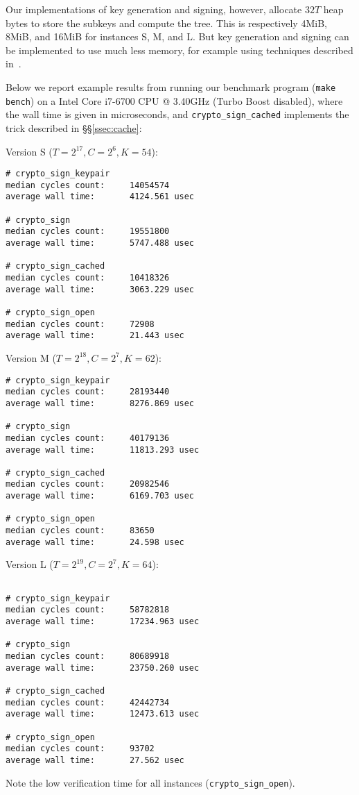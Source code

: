 Our implementations of key generation and signing, however, allocate $32T$ heap bytes to store the subkeys and compute the tree.
This is respectively 4MiB, 8MiB, and 16MiB for instances S, M, and L.
But key generation and signing can be implemented to use much less memory, for example using techniques described in~\cite{armed}.

Below we report example results from running our benchmark program (\texttt{make bench}) on a Intel Core i7-6700 CPU @ 3.40GHz (Turbo Boost disabled), where the wall time is given in microseconds, and \texttt{crypto\_sign\_cached} implements the trick described in \S\S\ref{ssec:cache}:

Version S ($T=2^{17}, C=2^6, K=54$):
{\footnotesize
\begin{verbatim}
# crypto_sign_keypair
median cycles count:     14054574
average wall time:       4124.561 usec

# crypto_sign
median cycles count:     19551800
average wall time:       5747.488 usec

# crypto_sign_cached
median cycles count:     10418326
average wall time:       3063.229 usec

# crypto_sign_open
median cycles count:     72908
average wall time:       21.443 usec
\end{verbatim}
}

Version M ($T=2^{18}, C=2^7, K=62$):
{\footnotesize
\begin{verbatim}
# crypto_sign_keypair
median cycles count:     28193440
average wall time:       8276.869 usec

# crypto_sign
median cycles count:     40179136
average wall time:       11813.293 usec

# crypto_sign_cached
median cycles count:     20982546
average wall time:       6169.703 usec

# crypto_sign_open
median cycles count:     83650
average wall time:       24.598 usec
\end{verbatim}
}

Version L ($T=2^{19}, C=2^7, K=64$):
{\footnotesize
\begin{verbatim}

# crypto_sign_keypair
median cycles count:     58782818
average wall time:       17234.963 usec

# crypto_sign
median cycles count:     80689918
average wall time:       23750.260 usec

# crypto_sign_cached
median cycles count:     42442734
average wall time:       12473.613 usec

# crypto_sign_open
median cycles count:     93702
average wall time:       27.562 usec
\end{verbatim}
}
Note the low verification time for all instances (\texttt{crypto\_sign\_open}).


